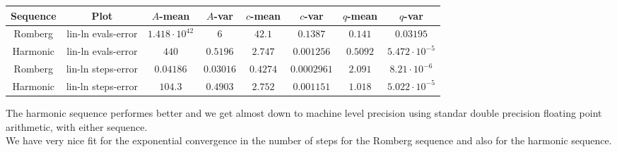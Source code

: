 \begin{table}[H]
    \centering
    \small
     \begin{tabular}{c|c||c|c|c|c|c|c}
Sequence & Plot & \(A\)-mean & \(A\)-var & \(c\)-mean & \(c\)-var & \(q\)-mean & \(q\)-var\\\hline
Romberg & lin-ln evals-error & \(1.418\cdot 10^{42}\) & \(6\) & \(42.1\) & \(0.1387\) & \(0.141\) & \(0.03195\) \\
Harmonic & lin-ln evals-error & \(440\) & \(0.5196\) & \(2.747\) & \(0.001256\) & \(0.5092\) & \(5.472\cdot 10^{-5}\) \\
Romberg & lin-ln steps-error & \(0.04186\) & \(0.03016\) & \(0.4274\) & \(0.0002961\) & \(2.091\) & \(8.21\cdot 10^{-6}\) \\
Harmonic & lin-ln steps-error & \(104.3\) & \(0.4903\) & \(2.752\) & \(0.001151\) & \(1.018\) & \(5.022\cdot 10^{-5}\) \\
    \end{tabular}
    \label{tab:my_label}
\end{table}

The harmonic sequence performes better and we get almost down to machine level precision using standar double precision floating point arithmetic, with either sequence.\\

We have very nice fit for the exponential convergence in the number of steps for the Romberg sequence and also for the harmonic sequence.

